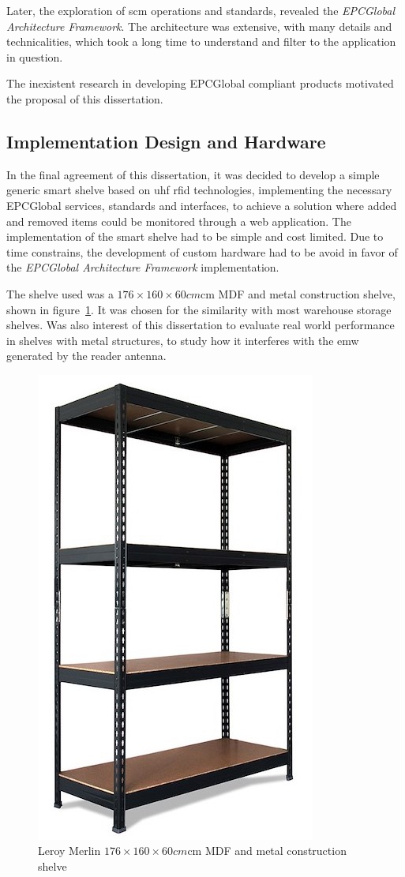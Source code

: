 Later, the exploration of \ac{scm} operations and standards, revealed the \emph{EPCGlobal Architecture Framework}. The architecture was extensive, with many details and technicalities, which took a long time to understand and filter to the application in question.

The inexistent research in developing EPCGlobal compliant products motivated the proposal of this dissertation.

\subsection{Implementation Design and Hardware}

In the final agreement of this dissertation, it was decided to develop a simple generic smart shelve based on \ac{uhf} \ac{rfid} technologies, implementing the necessary EPCGlobal services, standards and interfaces, to achieve a solution where added and removed items could be monitored through a web application.
The implementation of the smart shelve had to be simple and cost limited. 
Due to time constrains, the development of custom hardware had to be avoid in favor of the \emph{EPCGlobal Architecture Framework} implementation.

The shelve used was a $176\times160\times60cm$cm MDF and metal construction shelve, shown in figure~\ref{fig:commercialshelve}. It was chosen for the similarity with most warehouse storage shelves. Was also interest of this dissertation to evaluate real world performance in shelves with metal structures, to study how it interferes with the \ac{emw} generated by the reader antenna.

\begin{figure}
    \centering
    \includegraphics[width=0.4\linewidth]{./figs/estantedemetal.jpg}
    \caption{Leroy Merlin $176\times160\times60cm$cm MDF and metal construction shelve~\cite{EstanteMetalStabil}} 
    \label{fig:commercialshelve}
\end{figure}


